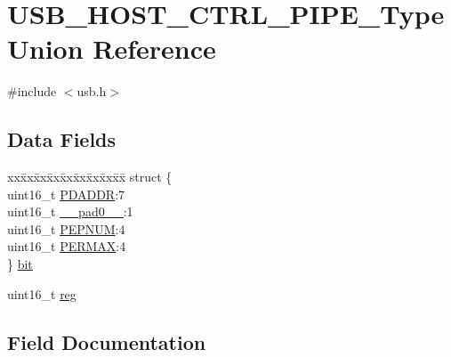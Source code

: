 \hypertarget{union_u_s_b___h_o_s_t___c_t_r_l___p_i_p_e___type}{}\section{U\+S\+B\+\_\+\+H\+O\+S\+T\+\_\+\+C\+T\+R\+L\+\_\+\+P\+I\+P\+E\+\_\+\+Type Union Reference}
\label{union_u_s_b___h_o_s_t___c_t_r_l___p_i_p_e___type}


{\ttfamily \#include $<$usb.\+h$>$}

\subsection*{Data Fields}
\begin{DoxyCompactItemize}
\item 
\begin{tabbing}
xx\=xx\=xx\=xx\=xx\=xx\=xx\=xx\=xx\=\kill
struct \{\\
\>uint16\_t \mbox{\hyperlink{union_u_s_b___h_o_s_t___c_t_r_l___p_i_p_e___type_adf5bdb1147ca5b80366e8acdd3731738}{PDADDR}}:7\\
\>uint16\_t \mbox{\hyperlink{union_u_s_b___h_o_s_t___c_t_r_l___p_i_p_e___type_a77132c2c26a75f5b8751b235cda23828}{\_\_pad0\_\_}}:1\\
\>uint16\_t \mbox{\hyperlink{union_u_s_b___h_o_s_t___c_t_r_l___p_i_p_e___type_a6879baf367525712160603e953c23f5f}{PEPNUM}}:4\\
\>uint16\_t \mbox{\hyperlink{union_u_s_b___h_o_s_t___c_t_r_l___p_i_p_e___type_a65dc22f08e2cd2a6b760b7513ad46473}{PERMAX}}:4\\
\} \mbox{\hyperlink{union_u_s_b___h_o_s_t___c_t_r_l___p_i_p_e___type_ae769dd9e819f8a82c22f06a5b4e5b007}{bit}}\\

\end{tabbing}\item 
uint16\+\_\+t \mbox{\hyperlink{union_u_s_b___h_o_s_t___c_t_r_l___p_i_p_e___type_a11760f5020019f4aa8cb02e694f7cc44}{reg}}
\end{DoxyCompactItemize}


\subsection{Field Documentation}
\mbox{\label{union_u_s_b___h_o_s_t___c_t_r_l___p_i_p_e___type_a77132c2c26a75f5b8751b235cda23828}} 
